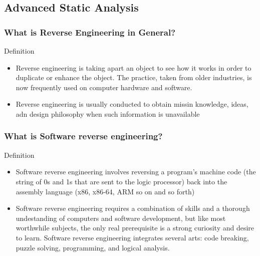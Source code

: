 \documentclass[]{beamer}
\begin{document}
	\subsection{Advanced Static Analysis}
		\begin{frame}
			\frametitle{What is Reverse Engineering in General?}
			
			\begin{block}{Definition}
				\begin{itemize}
					\item{Reverse engineering is taking apart an object to see how it works in order to duplicate or enhance the object. The practice, taken from older industries, is now frequently used on computer hardware and software.}
					\item{Reverse engineering is usually conducted to obtain missin knowledge, ideas, adn design philosophy when such information is unavailable}
				\end{itemize}
			\end{block}
		\end{frame}	
		\begin{frame}	
			\frametitle{What is Software reverse engineering?}
			\begin{block}{Definition}
				\begin{itemize}
					\item{Software reverse engineering involves reversing a program's machine code (the string of 0s and 1s that are sent to the logic processor) back into the assembly language (x86, x86-64, ARM so on and so forth) }
					\item{Software reverse engineering requires a combination of skills and a thorough undestanding of computers and software development, but like most worthwhile subjects, the only real prerequisite is a strong curiosity and desire to learn. Software reverse engineering integrates several arts: code breaking, puzzle solving, programming, and logical analysis.}
				\end{itemize}
			\end{block}
		\end{frame}
\end{document}
